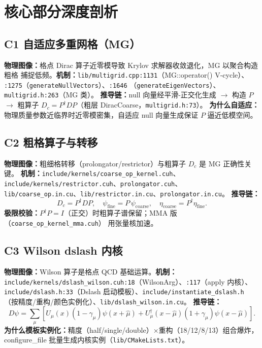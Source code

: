 \documentclass[UTF8]{ctexart}
\begin{document}
\section{核心部分深度剖析}

\subsection{C1 自适应多重网格（MG）}
\textbf{物理图像：}格点 Dirac 算子近零模导致 Krylov 求解器收敛退化，MG 以聚合构造粗格
捕捉低频。\textbf{机制：}\texttt{lib/multigrid.cpp:1131}（MG::operator() V-cycle）、
\texttt{:1275}（\texttt{generateNullVectors}）、\texttt{:1646}
（\texttt{generateEigenVectors}）、\texttt{multigrid.h:263}（MG 类）。
\textbf{推导链：}null 向量经平滑-正交化生成 $\rightarrow$ 构造 $P$ $\rightarrow$ 粗算子
$D_c=P^\dagger D P$（粗层 DiracCoarse，\texttt{multigrid.h:73}）。
\textbf{为什么自适应：}物理质量参数近临界时近零模密集，自适应 null 向量生成保证 $P$
逼近低模空间。

\subsection{C2 粗格算子与转移}
\textbf{物理图像：}粗细格转移（prolongator/restrictor）与粗算子 $D_c$ 是 MG 正确性关键。
\textbf{机制：}\nolinkurl{include/kernels/coarse_op_kernel.cuh}、
\nolinkurl{include/kernels/restrictor.cuh}、\texttt{prolongator.cuh}、
\texttt{lib/coarse\_op.in.cu}、\texttt{lib/restrictor.in.cu}、\texttt{prolongator.in.cu}。
\textbf{推导链：}
\begin{equation}\label{eq:mggalerkin}
D_c = P^\dagger D P,\quad \psi_{\text{fine}} = P\,\psi_{\text{coarse}},\quad \eta_{\text{coarse}} = P^\dagger \eta_{\text{fine}}.
\end{equation}
\textbf{极限校验：}$P^\dagger P = I$（正交）时粗算子谱保留；MMA 版（\nolinkurl{coarse_op_kernel_mma.cuh}）
用张量核加速。

\subsection{C3 Wilson dslash 内核}
\textbf{物理图像：}Wilson 算子是格点 QCD 基础运算。\textbf{机制：}
\nolinkurl{include/kernels/dslash_wilson.cuh:18}（WilsonArg）、\texttt{:117}（apply 内核）、
\texttt{include/dslash.h:33}（Dslash 启动模板）、\nolinkurl{include/instantiate_dslash.h}
（按精度/重构/颜色实例化）、\nolinkurl{lib/dslash_wilson.in.cu}。
\textbf{推导链：}
\begin{equation}\label{eq:dslash}
D\psi = \sum_\mu\left[U_\mu(x)(1-\gamma_\mu)\psi(x+\hat\mu) + U_\mu^\dagger(x-\hat\mu)(1+\gamma_\mu)\psi(x-\hat\mu)\right].
\end{equation}
\textbf{为什么模板实例化：}精度（half/single/double）×重构（18/12/8/13）组合爆炸，
configure\_file 批量生成内核实例（\texttt{lib/CMakeLists.txt}）。
\end{document}
